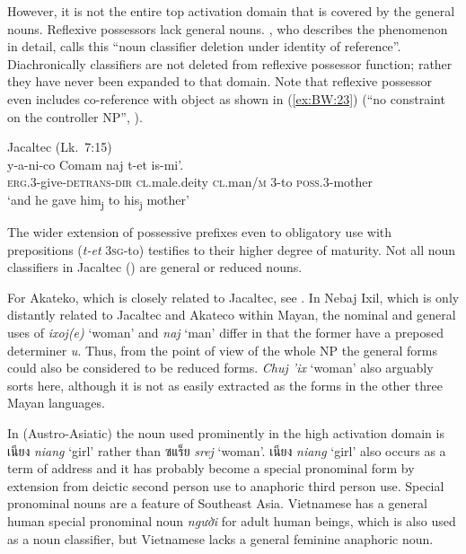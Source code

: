 \documentclass[output=collectionpaper]{langsci/langscibook}
\begin{document}
However, it is not the entire top activation domain that is covered by the general nouns. Reflexive possessors lack general nouns. \citet[159]{Craig1977}, who describes the phenomenon in detail, calls this “noun classifier deletion under identity of reference”. Diachronically classifiers are not deleted from reflexive possessor function; rather they have never been expanded to that domain. Note that reflexive possessor even includes co-reference with object as shown in (\ref{ex:BW:23}) (“no constraint on the controller NP”, \citealt[152]{Craig1977}).

\ea\label{ex:BW:23}
Jacaltec (Lk.~7:15)\\
\gll y-a-ni-co	Comam	naj	t-et	is-mi'.\\
\textsc{erg}.3-give-\textsc{detrans-dir}	\textsc{cl}.male.deity	\textsc{cl}.man/\textsc{m}	3-to	\textsc{poss}.3-mother\\
\glt ‘and he gave him\textsubscript{j} to his\textsubscript{j} mother’\\
\z

The wider extension of possessive prefixes even to obligatory use with prepositions (\textit{t-et} \textsc{3sg}-to) testifies to their higher degree of maturity. Not all noun classifiers in Jacaltec (\citealt[125]{Day1973}) are general or reduced nouns.

For Akateko, which is closely related to Jacaltec, see \citet{Zavala1992}. In Nebaj Ixil, which is only distantly related to Jacaltec and Akateco within Mayan, the nominal and general uses of \textit{ixoj(e)} ‘woman’ and \textit{naj} ‘man’ differ in that the former have a preposed determiner \textit{u}. Thus, from the point of view of the whole NP the general forms could also be considered to be reduced forms. \textit{Chuj 'ix} ‘woman’ also arguably sorts here, although it is not as easily extracted as the forms in the other three Mayan languages.

In  (Austro-Asiatic) the noun used prominently in the high activation domain is เนียง \textit{niang} ‘girl’ rather than ซแร็ย \textit{srej} ‘woman’. เนียง \textit{niang} ‘girl’ also occurs as a term of address and it has probably become a special pronominal form by extension from deictic second person use to anaphoric third person use. Special pronominal nouns are a feature of Southeast Asia. Vietnamese has a general human special pronominal noun \textit{người} for adult human beings, which is also used as a noun classifier, but Vietnamese lacks a general feminine anaphoric noun.
\end{document}
